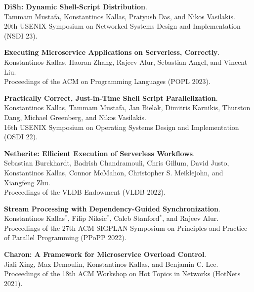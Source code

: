 \begin{minipage}{\textwidth}
\textbf{DiSh: Dynamic Shell-Script Distribution}. \\
Tammam Mustafa, Konstantinos Kallas, Pratyush Das, and Nikos Vasilakis. \\
20th USENIX Symposium on Networked Systems Design and Implementation (NSDI 23).
\end{minipage}

\begin{minipage}{\textwidth}
\textbf{Executing Microservice Applications on Serverless, Correctly}. \\
Konstantinos Kallas, Haoran Zhang, Rajeev Alur, Sebastian Angel, and Vincent Liu. \\
Proceedings of the ACM on Programming Languages (POPL 2023).
\end{minipage}

\begin{minipage}{\textwidth}
\textbf{Practically Correct, Just-in-Time Shell Script Parallelization}. \\
Konstantinos Kallas, Tammam Mustafa, Jan Bielak, Dimitris Karnikis, Thurston Dang, Michael Greenberg, and Nikos Vasilakis. \\
16th USENIX Symposium on Operating Systems Design and Implementation (OSDI 22).
\end{minipage}

\begin{minipage}{\textwidth}
\textbf{Netherite: Efficient Execution of Serverless Workflows}. \\
Sebastian Burckhardt, Badrish Chandramouli, Chris Gillum, David Justo, Konstantinos Kallas, Connor McMahon, Christopher S. Meiklejohn, and Xiangfeng Zhu. \\
Proceedings of the VLDB Endowment (VLDB 2022).
\end{minipage}

\begin{minipage}{\textwidth}
\textbf{Stream Processing with Dependency-Guided Synchronization}. \\
Konstantinos Kallas$^*$, Filip Niksic$^*$, Caleb Stanford$^*$, and Rajeev Alur. \\
Proceedings of the 27th ACM SIGPLAN Symposium on Principles and Practice of Parallel Programming (PPoPP 2022).
\end{minipage}

\begin{minipage}{\textwidth}
\textbf{Charon: A Framework for Microservice Overload Control}. \\
Jiali Xing, Max Demoulin, Konstantinos Kallas, and Benjamin C. Lee. \\
Proceedings of the 18th ACM Workshop on Hot Topics in Networks (HotNets 2021).
\end{minipage}

